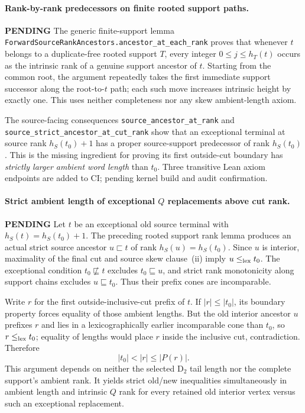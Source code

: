 \documentclass[11pt]{article}
\newcommand{\todo}{\textcolor{gray!70!black}{\textbf{PENDING}}}
\newcommand{\lean}[1]{\texttt{#1}}
\begin{document}
\paragraph{Rank-by-rank predecessors on finite rooted support paths.} \todo
The generic finite-support lemma
\lean{ForwardSourceRankAncestors.ancestor\_at\_each\_rank}
proves that whenever $t$ belongs to a duplicate-free
rooted support $T$, every integer $0\le j\le h_T(t)$
occurs as the intrinsic rank of a genuine support
ancestor of $t$. Starting from the common root, the
argument repeatedly takes the first immediate support
successor along the root-to-$t$ path; each such move
increases intrinsic height by exactly one. This uses
neither completeness nor any skew ambient-length axiom.

The source-facing consequences
\lean{source\_ancestor\_at\_rank} and
\lean{source\_strict\_ancestor\_at\_cut\_rank}
show that an exceptional terminal at source rank
$h_S(t_0)+1$ has a proper source-support predecessor
of rank $h_S(t_0)$. This is the missing ingredient for
proving its first outside-cut boundary has
\emph{strictly larger ambient word length} than $t_0$.
Three transitive Lean axiom endpoints are added to
CI; pending kernel build and audit confirmation.


\paragraph{Strict ambient length of exceptional $Q$ replacements above cut rank.} \todo
Let $t$ be an exceptional old source terminal with
$h_S(t)=h_S(t_0)+1$. The preceding rooted support rank
lemma produces an actual strict source ancestor $u\sqsubset t$
of rank $h_S(u)=h_S(t_0)$. Since $u$ is interior,
maximality of the final cut and source skew clause~(ii)
imply $u\le_{\rm lex}t_0$. The exceptional condition
$t_0\not\sqsubseteq t$ excludes $t_0\sqsubseteq u$,
and strict rank monotonicity along support chains excludes
$u\sqsubseteq t_0$. Thus their prefix cones are incomparable.

Write $r$ for the first outside-inclusive-cut prefix of $t$.
If $|r|\le|t_0|$, its boundary property forces equality
of those ambient lengths. But the old interior ancestor
$u$ prefixes $r$ and lies in a lexicographically earlier
incomparable cone than $t_0$, so
$r\le_{\rm lex}t_0$; equality of lengths would place
$r$ inside the inclusive cut, contradiction. Therefore
\[
  |t_0|<|r|\le |P(r)|.
\]
This argument depends on neither the selected D$_2$
tail length nor the complete support's ambient rank.
It yields strict old/new inequalities simultaneously in
ambient length and intrinsic $Q$ rank for every retained
old interior vertex versus such an exceptional replacement.
\end{document}
